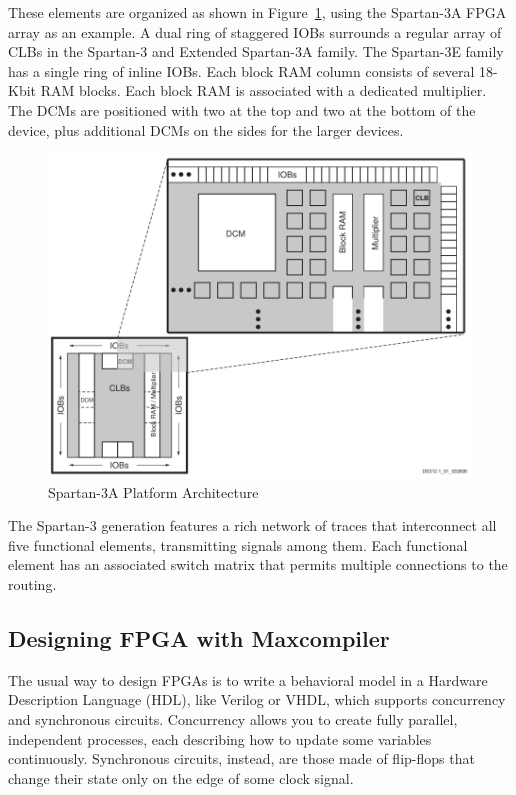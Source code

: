 These elements are organized as shown in Figure~\ref{fig:spartan_arch},
using the Spartan-3A FPGA
array as an example. A dual ring of staggered IOBs surrounds a regular
array of CLBs in the Spartan-3 and Extended Spartan-3A family. The
Spartan-3E family has a single ring of inline IOBs. Each block RAM column
consists of several 18-Kbit RAM blocks. Each block RAM is associated with a
dedicated multiplier. The DCMs are positioned with two at the top and two
at the bottom of the device, plus additional DCMs on the sides for the
larger devices.

\begin{figure}[h]
  \centering
  \includegraphics[scale=0.3]{img/spartan_arch.png}
  \caption{Spartan-3A Platform Architecture}
  \label{fig:spartan_arch}
\end{figure}

The Spartan-3 generation features a rich network of traces that
interconnect all five functional elements, transmitting signals among them.
Each functional element has an associated switch matrix that permits
multiple connections to the routing\cite{fpgaug}.

\subsection{Designing FPGA with Maxcompiler}

The usual way to design FPGAs is to write a behavioral model in
a Hardware Description Language (HDL), like Verilog or VHDL, which
supports concurrency and synchronous circuits. Concurrency allows
you to create fully parallel, independent processes, each describing
how to update some variables continuously. Synchronous circuits, instead,
are those made of flip-flops that change their state only on the edge
of some clock signal.

